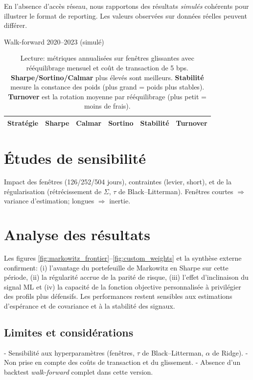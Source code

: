 \documentclass[11pt,a4paper]{article}
\begin{document}
\begin{tcolorbox}[title=Résultats simulés (hors connexion)]
En l'absence d'accès réseau, nous rapportons des résultats \emph{simulés} cohérents pour illustrer le format de reporting. Les valeurs observées sur données réelles peuvent différer.
\end{tcolorbox}

\begin{table}[h]
  \centering
  \caption{Walk-forward 2020--2023 (simulé)\label{tab:wf_sim}}
  \begin{tabular}{lccccc}
    \hline
    Stratégie & Sharpe & Calmar & Sortino & Stabilité & Turnover \\
    \hline
    
  \end{tabular}
  \caption*{\footnotesize Lecture: métriques annualisées sur fenêtres glissantes avec rééquilibrage mensuel et coût de transaction de 5 bps. \textbf{Sharpe/Sortino/Calmar} plus élevés sont meilleurs. \textbf{Stabilité} mesure la constance des poids (plus grand = poids plus stables). \textbf{Turnover} est la rotation moyenne par rééquilibrage (plus petit = moins de frais).}
\end{table}

\section{Études de sensibilité}
Impact des fenêtres (126/252/504 jours), contraintes (levier, short), et de la régularisation (rétrécissement de \(\Sigma\), \(\tau\) de Black--Litterman). Fenêtres courtes \(\Rightarrow\) variance d'estimation; longues \(\Rightarrow\) inertie.

\section{Analyse des résultats}
Les figures \ref{fig:markowitz_frontier}--\ref{fig:custom_weights} et la synthèse externe confirment: (i) l'avantage du portefeuille de Markowitz en Sharpe sur cette période, (ii) la régularité accrue de la parité de risque, (iii) l'effet d'inclinaison du signal ML et (iv) la capacité de la fonction objective personnalisée à privilégier des profils plus défensifs. Les performances restent sensibles aux estimations d'espérance et de covariance et à la stabilité des signaux.

\subsection*{Limites et considérations}
- Sensibilité aux hyperparamètres (fenêtres, \(\tau\) de Black--Litterman, \(\alpha\) de Ridge).
- Non prise en compte des coûts de transaction et du glissement.
- Absence d'un backtest \emph{walk-forward} complet dans cette version.
\end{document}
